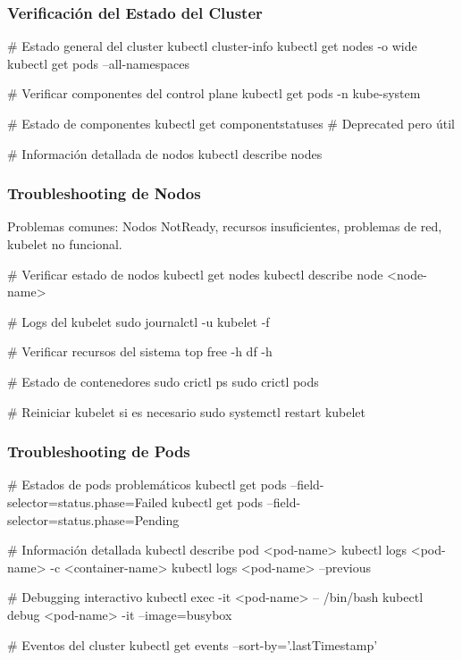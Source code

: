 \documentclass[11pt,a4paper]{article}
\begin{document}
\subsubsection{Verificación del Estado del Cluster}

\begin{commandbox}
\# Estado general del cluster
kubectl cluster-info
kubectl get nodes -o wide
kubectl get pods --all-namespaces

\# Verificar componentes del control plane
kubectl get pods -n kube-system

\# Estado de componentes
kubectl get componentstatuses  # Deprecated pero útil

\# Información detallada de nodos
kubectl describe nodes
\end{commandbox}

\subsubsection{Troubleshooting de Nodos}

\begin{errorbox}
Problemas comunes: Nodos NotReady, recursos insuficientes, problemas de red, kubelet no funcional.
\end{errorbox}

\begin{commandbox}
\# Verificar estado de nodos
kubectl get nodes
kubectl describe node <node-name>

\# Logs del kubelet
sudo journalctl -u kubelet -f

\# Verificar recursos del sistema
top
free -h
df -h

\# Estado de contenedores
sudo crictl ps
sudo crictl pods

\# Reiniciar kubelet si es necesario
sudo systemctl restart kubelet
\end{commandbox}

\subsubsection{Troubleshooting de Pods}

\begin{commandbox}
\# Estados de pods problemáticos
kubectl get pods --field-selector=status.phase=Failed
kubectl get pods --field-selector=status.phase=Pending

\# Información detallada
kubectl describe pod <pod-name>
kubectl logs <pod-name> -c <container-name>
kubectl logs <pod-name> --previous

\# Debugging interactivo
kubectl exec -it <pod-name> -- /bin/bash
kubectl debug <pod-name> -it --image=busybox

\# Eventos del cluster
kubectl get events --sort-by='.lastTimestamp'
\end{commandbox}
\end{document}
